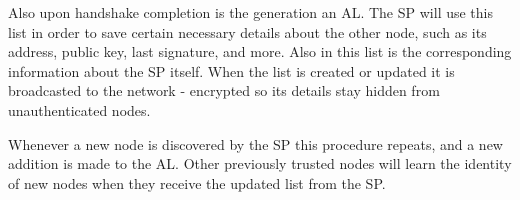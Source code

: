Also upon handshake completion is the generation an \ac{AL}. The \ac{SP} will
use this list in order to save certain necessary details about the other node,
such as its address, public key, last signature, and more. Also in this list is
the corresponding information about the \ac{SP} itself. When the list is created
or updated it is broadcasted to the network - encrypted so its details stay
hidden from unauthenticated nodes.

Whenever a new node is discovered by the \ac{SP} this procedure repeats, and a
new addition is made to the \ac{AL}. Other previously trusted nodes will learn
the identity of new nodes when they receive the updated list from the \ac{SP}.
